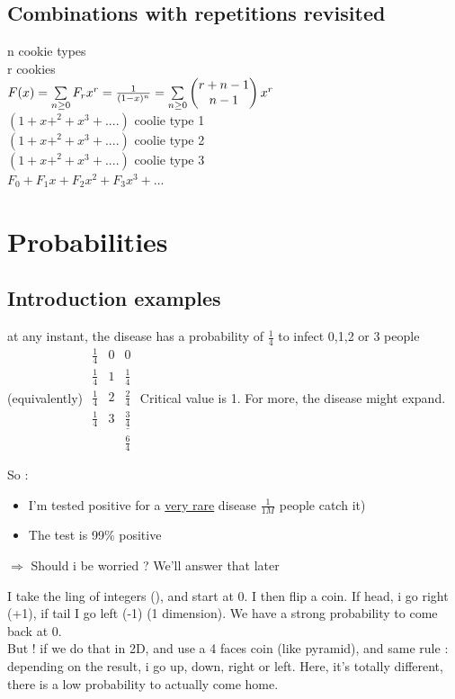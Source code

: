 \documentclass[12pt,a4paper]{article}
\begin{document}
\subsection{Combinations with repetitions revisited}
n cookie types\\
r cookies\\
$F(x) = \sum\limits_{n\geq 0} F_r x^r = \frac{1}{(1-x)^n} = \sum\limits_{n\geq 0} \begin{pmatrix} r+n-1\\ n-1 \end{pmatrix}x^r$\\
$(1+x+^2+x^3+....)$ coolie type 1\\
$(1+x+^2+x^3+....)$ coolie type 2\\
$(1+x+^2+x^3+....)$ coolie type 3\\
$F_0+F_1x+F_2x^2+F_3x^3+...$


\section{Probabilities}
\subsection{Introduction examples}
at any instant, the disease has a probability of $\frac{1}{4}$ to infect 0,1,2 or 3 people (equivalently)
$\begin{array}{lll}
\frac{1}{4} & 0 & 0\\
\frac{1}{4} & 1 & \frac{1}{4}\\
\frac{1}{4} & 2 & \frac{2}{4}\\
\frac{1}{4} & 3 & \underline{\frac{3}{4}}\\
&&\frac{6}{4}
\end{array}$
Critical value is 1. For more, the disease might expand.

So :
\begin{itemize}
	\item I'm tested positive for a \underline{very rare} disease $\frac{1}{1M}$ people catch it)
	\item The test is 99\% positive
\end{itemize}
$\Rightarrow$ Should i be worried ? We'll answer that later

I take the ling of integers (\Z), and start at 0. I then flip a coin. If head, i go right (+1), if tail I go left (-1) (1 dimension). We have a strong probability to come back at 0.\\
But ! if we do that in 2D, and use a 4 faces coin (like pyramid), and same rule : depending on the result, i go up, down, right or left. Here, it's totally different, there is a low probability to actually come home.
\end{document}
